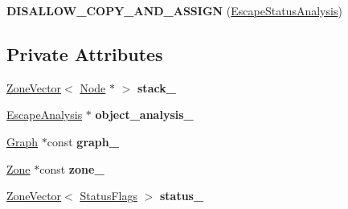\begin{DoxyCompactItemize}
\item 
{\bfseries D\+I\+S\+A\+L\+L\+O\+W\+\_\+\+C\+O\+P\+Y\+\_\+\+A\+N\+D\+\_\+\+A\+S\+S\+I\+GN} (\hyperlink{classv8_1_1internal_1_1compiler_1_1_escape_status_analysis}{Escape\+Status\+Analysis})\hypertarget{classv8_1_1internal_1_1compiler_1_1_escape_status_analysis_aeec8fa3ca6d1d8e54d14550477520ab3}{}\label{classv8_1_1internal_1_1compiler_1_1_escape_status_analysis_aeec8fa3ca6d1d8e54d14550477520ab3}

\end{DoxyCompactItemize}
\subsection*{Private Attributes}
\begin{DoxyCompactItemize}
\item 
\hyperlink{classv8_1_1internal_1_1_zone_vector}{Zone\+Vector}$<$ \hyperlink{classv8_1_1internal_1_1compiler_1_1_node}{Node} $\ast$ $>$ {\bfseries stack\+\_\+}\hypertarget{classv8_1_1internal_1_1compiler_1_1_escape_status_analysis_aa988d1da6d7aea56a4fdfa97f30a18b2}{}\label{classv8_1_1internal_1_1compiler_1_1_escape_status_analysis_aa988d1da6d7aea56a4fdfa97f30a18b2}

\item 
\hyperlink{classv8_1_1internal_1_1compiler_1_1_escape_analysis}{Escape\+Analysis} $\ast$ {\bfseries object\+\_\+analysis\+\_\+}\hypertarget{classv8_1_1internal_1_1compiler_1_1_escape_status_analysis_a775c5252ae4359bf2c3acac01493ca26}{}\label{classv8_1_1internal_1_1compiler_1_1_escape_status_analysis_a775c5252ae4359bf2c3acac01493ca26}

\item 
\hyperlink{classv8_1_1internal_1_1compiler_1_1_graph}{Graph} $\ast$const {\bfseries graph\+\_\+}\hypertarget{classv8_1_1internal_1_1compiler_1_1_escape_status_analysis_aa38992d23489dc4b887e955db65b7314}{}\label{classv8_1_1internal_1_1compiler_1_1_escape_status_analysis_aa38992d23489dc4b887e955db65b7314}

\item 
\hyperlink{classv8_1_1internal_1_1_zone}{Zone} $\ast$const {\bfseries zone\+\_\+}\hypertarget{classv8_1_1internal_1_1compiler_1_1_escape_status_analysis_ae2110ec0d2fe0c24de6812dce291e078}{}\label{classv8_1_1internal_1_1compiler_1_1_escape_status_analysis_ae2110ec0d2fe0c24de6812dce291e078}

\item 
\hyperlink{classv8_1_1internal_1_1_zone_vector}{Zone\+Vector}$<$ \hyperlink{classv8_1_1base_1_1_flags}{Status\+Flags} $>$ {\bfseries status\+\_\+}\hypertarget{classv8_1_1internal_1_1compiler_1_1_escape_status_analysis_abcc4a9a01dff0b09be1ccf69f65456ff}{}\label{classv8_1_1internal_1_1compiler_1_1_escape_status_analysis_abcc4a9a01dff0b09be1ccf69f65456ff}


\end{DoxyCompactItemize}
